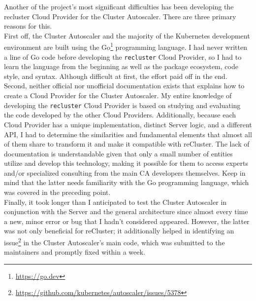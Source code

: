Another of the project's most significant difficulties has been developing the recluster
Cloud Provider for the Cluster Autoscaler. There are three primary reasons for
this. \\ %
First off, the Cluster Autoscaler and the majority of the Kubernetes development
environment are built using the Go\footnote{\url{https://go.dev}} programming language.
I had never written a line of Go code before developing the \texttt{recluster} Cloud
Provider, so I had to learn the language from the beginning as well as the
package ecosystem, code style, and syntax. Although difficult at first, the
effort paid off in the end. \\ %
Second, neither official nor unofficial documentation exists that explains how to
create a Cloud Provider for the Cluster Autoscaler. My entire knowledge of
developing the \texttt{recluster} Cloud Provider is based on studying and evaluating
the code developed by the other Cloud Providers. Additionally, because each Cloud
Provider has a unique implementation, distinct Server logic, and a different API,
I had to determine the similarities and fundamental elements that almost all of
them share to transform it and make it compatible with reCluster. The lack of documentation
is understandable given that only a small number of entities utilize and develop
this technology, making it possible for them to access experts and/or
specialized consulting from the main CA developers themselves. Keep in mind that
the latter needs familiarity with the Go programming language, which was covered
in the preceding point. \\ %
Finally, it took longer than I anticipated to test the Cluster Autoscaler in conjunction
with the Server and the general architecture since almost every time a new,
minor error or bug that I hadn't considered appeared. However, the latter was
not only beneficial for reCluster; it additionally helped in identifying an issue\footnote{\url{https://github.com/kubernetes/autoscaler/issues/5378}}
in the Cluster Autoscaler's main code, which was submitted to the maintainers
and promptly fixed within a week. \\ %

